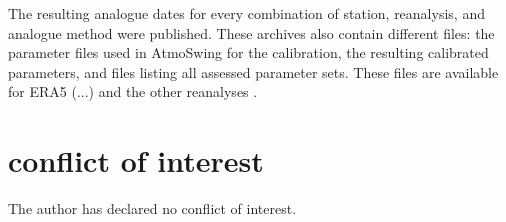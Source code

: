 \documentclass[alpha-refs]{wiley-article}
\begin{document}
The resulting analogue dates for every combination of station, reanalysis, and analogue method were published. These archives also contain different files: the parameter files used in AtmoSwing for the calibration, the resulting calibrated parameters, and files listing all assessed parameter sets. These files are available for ERA5 (...) and the other reanalyses \citep[see references in][]{Horton2018b}.



\section*{conflict of interest}
The author has declared no conflict of interest.










\end{document}

